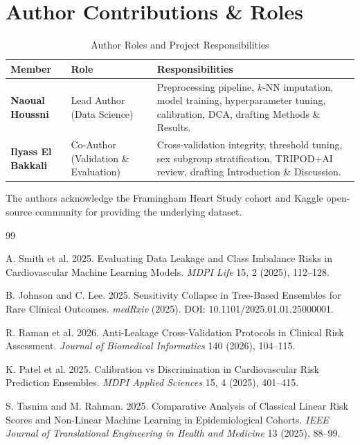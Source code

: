 \documentclass[manuscript, screen, review]{jair}
\begin{document}
\section{Author Contributions \& Roles}

\begin{table}[ht]
  \caption{Author Roles and Project Responsibilities}
  \label{tab:roles}
  \centering
  \begin{tabular}{@{}llp{7.5cm}@{}}
    \toprule
    Member & Role & Responsibilities \\
    \midrule
    \textbf{Naoual Houssni} & Lead Author (Data Science) & Preprocessing pipeline, $k$-NN imputation, model training, hyperparameter tuning, calibration, DCA, drafting Methods \& Results. \\
    \textbf{Ilyass El Bakkali} & Co-Author (Validation \& Evaluation) & Cross-validation integrity, threshold tuning, sex subgroup stratification, TRIPOD+AI review, drafting Introduction \& Discussion. \\
    \bottomrule
  \end{tabular}
\end{table}

\begin{acks}
The authors acknowledge the Framingham Heart Study cohort and Kaggle open-source community for providing the underlying dataset.
\end{acks}

\begin{thebibliography}{99}

A. Smith et al. 2025. Evaluating Data Leakage and Class Imbalance Risks in Cardiovascular Machine Learning Models. \emph{MDPI Life} 15, 2 (2025), 112--128.

B. Johnson and C. Lee. 2025. Sensitivity Collapse in Tree-Based Ensembles for Rare Clinical Outcomes. \emph{medRxiv} (2025). DOI: 10.1101/2025.01.01.25000001.

R. Raman et al. 2026. Anti-Leakage Cross-Validation Protocols in Clinical Risk Assessment. \emph{Journal of Biomedical Informatics} 140 (2026), 104--115.

K. Patel et al. 2025. Calibration vs Discrimination in Cardiovascular Risk Prediction Ensembles. \emph{MDPI Applied Sciences} 15, 4 (2025), 401--415.

S. Tasnim and M. Rahman. 2025. Comparative Analysis of Classical Linear Risk Scores and Non-Linear Machine Learning in Epidemiological Cohorts. \emph{IEEE Journal of Translational Engineering in Health and Medicine} 13 (2025), 88--99.

\end{thebibliography}
\end{document}
